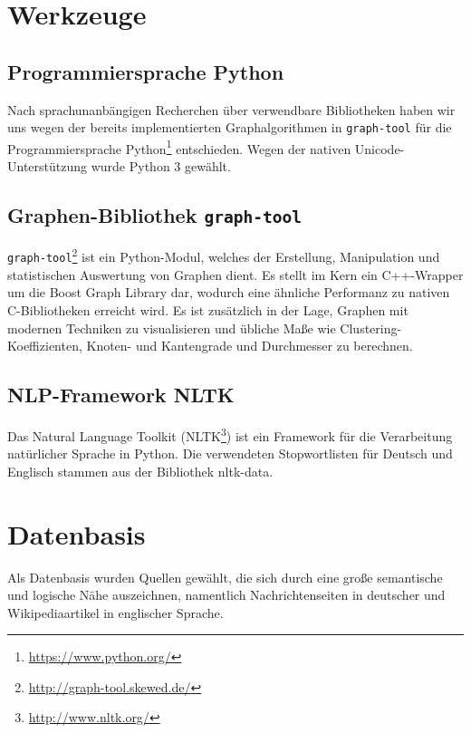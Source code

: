 \documentclass[11pt, a4paper]{article}
\begin{document}
\section{Werkzeuge}

\subsection{Programmiersprache Python}
Nach sprachunanbängigen Recherchen über verwendbare Bibliotheken haben wir uns
wegen der bereits implementierten Graphalgorithmen in \texttt{graph-tool} für
die Programmiersprache Python\footnote{\url{https://www.python.org/}}
entschieden.
Wegen der nativen Unicode-Unterstützung wurde Python 3 gewählt.

\subsection{Graphen-Bibliothek \texttt{graph-tool}}
\texttt{graph-tool}\footnote{\url{http://graph-tool.skewed.de/}} ist ein
Python-Modul, welches der Erstellung, Manipulation und statistischen
Auswertung von Graphen dient. Es stellt im Kern ein C++-Wrapper um die Boost
Graph Library dar, wodurch eine \"ahnliche Performanz zu nativen C-Bibliotheken
erreicht wird. Es ist zus\"atzlich in der Lage, Graphen mit modernen Techniken
zu visualisieren und \"ubliche Ma\ss{}e wie Clustering-Koeffizienten, Knoten-
und Kantengrade und Durchmesser zu berechnen.

\subsection{NLP-Framework NLTK}
Das Natural Language Toolkit (NLTK\footnote{\url{http://www.nltk.org/}}) ist
ein Framework f\"ur die Verarbeitung natürlicher Sprache in Python.
Die verwendeten Stopwortlisten für Deutsch und Englisch stammen aus der
Bibliothek nltk-data.


\section{Datenbasis}

Als Datenbasis wurden Quellen gew\"ahlt, die sich durch eine gro\ss{}e
semantische und logische N\"ahe auszeichnen, namentlich Nachrichtenseiten in
deutscher und Wikipediaartikel in englischer Sprache.
\end{document}

